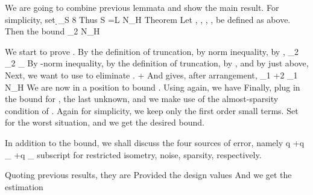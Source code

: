 \stopsubsection

\startsubsection [title={Main Result}]

We are going to combine previous lemmata and show the main result.
For simplicity, set
%
 {
\NC \d_S
\leq \NC {} {8} \NR
}
%
Thus
 {
\NC S
=\NC L \log N_H \NR
}
%
\Result
{Theorem}
{
Let , , , ,  be defined as above.
Then the bound
%
 {
\NC {} _2
\leq {}  \log N_H \NR
}
}
%

We start to prove .
By the definition of truncation, by  norm inequality, by ,
%
 {
\NC {} _2
\leq \NC {} _2 \NR
%
\NC \leq \NC {}  _\infty \NR
%
\NC \leq {}  \NR
}
%
By -norm inequality, by the definition of truncation, by , and by  just above,
%
%
Next, we want to use  to eliminate .
%
 {
\NC \leq {} 
+ {}  \NR
}
%
And  gives, after arrangement,
%
 {
\NC {} _1
\leq {} 
+2 _1 \NR
%
\NC \leq \NC {} \log N_H \NR
}
%
We are now in a position to bound .
Using  again, we have
%
%
Finally, plug in the bound for , the last unknown, and we make use of the almost-sparsity condition of .
Again for simplicity, we keep only the first order small terms.
%
%
Set  for the worst situation, and we get the desired bound.

In addition to the bound, we shall discuss the four sources of error, namely
 {
\NC q
\simeq {}  +q _{} +q _{} \NR
}
subscript for restricted isometry, noise, sparsity, respectively.

Quoting previous results, they are
%
Provided the design values
%
And we get the estimation
%
\stopsubsection
\stopsection


